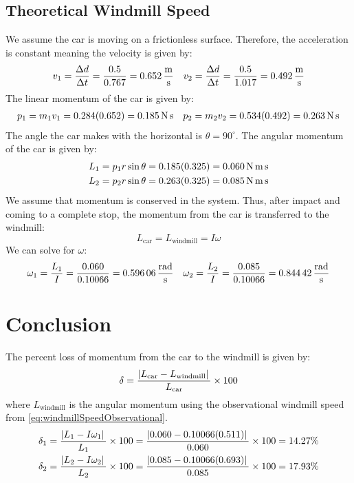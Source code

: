 \documentclass[article, 12pt]{article}
\begin{document}
    \subsection{Theoretical Windmill Speed}
    We assume the car is moving on a frictionless surface. Therefore, the acceleration is constant meaning the velocity is given by:
    \begin{align}
        v_1 = \frac{\Delta d}{\Delta t} = \frac{0.5}{0.767} = \text{\SI{0.652}{\frac{\meter}{\second}}} && v_2 = \frac{\Delta d}{\Delta t} = \frac{0.5}{1.017} = \text{\SI{0.492}{\frac{\meter}{\second}}}\label{eq:carVelocity}
    \end{align}
    The linear momentum of the car is given by:
    \begin{align}
        p_1 = m_1 v_1 = 0.284(0.652) = \text{\SI{0.185}{\newton\second}} && p_2 = m_2 v_2 = 0.534(0.492) = \text{\SI{0.263}{\newton\second}}\label{eq:carMomentum}
    \end{align}
    The angle the car makes with the horizontal is $\theta = 90^\circ$. The angular momentum of the car is given by:
    \begin{align}
        L_1 &= p_1 r \sin \theta = 0.185(0.325) = \text{\SI{0.060}{\newton\meter\second}} \nonumber\\
        L_2 &= p_2 r \sin \theta = 0.263(0.325) = \text{\SI{0.085}{\newton\meter\second}}\label{eq:carAngularMomentum}
    \end{align}
    We assume that momentum is conserved in the system. Thus, after impact and coming to a complete stop, the momentum from the car is transferred to the windmill:
    \begin{equation}
        L_\text{car} = L_\text{windmill} = I\omega \label{eq:momentumConservation}
    \end{equation}
    We can solve for $\omega$:
    \begin{align}
        \omega_1 = \frac{L_1}{I} = \frac{0.060}{0.10066} = \text{\SI{0.59606}{\frac{\radian}{\second}}} && \omega_2 = \frac{L_2}{I} = \frac{0.085}{0.10066} = \text{\SI{0.84442}{\frac{\radian}{\second}}}\label{eq:windmillSpeedTheoretical}
    \end{align}
    \section{Conclusion}
    The percent loss of momentum from the car to the windmill is given by:
    \begin{equation}
        \delta = \frac{\abs*{L_\text{car} - L_\text{windmill}}}{L_\text{car}} \times 100
    \end{equation}
    where $L_\text{windmill}$ is the angular momentum using the observational windmill speed from \autoref{eq:windmillSpeedObservational}.
    \begin{align}
        \delta_1 &= \frac{\abs*{L_1 - I\omega_1}}{L_1} \times 100 = \frac{\abs*{0.060 - 0.10066(0.511)}}{0.060} \times 100 = 14.27\% \nonumber\\
        \delta_2 &= \frac{\abs*{L_2 - I\omega_2}}{L_2} \times 100 = \frac{\abs*{0.085 - 0.10066(0.693)}}{0.085} \times 100 = 17.93\%
    \end{align}
\end{document}
